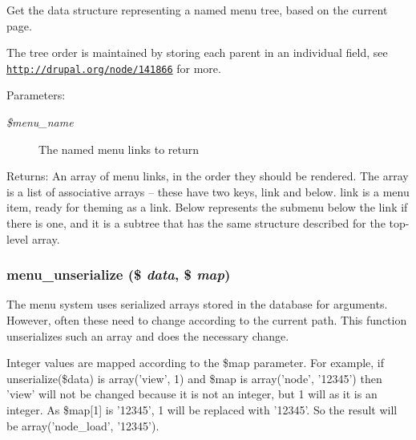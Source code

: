 Get the data structure representing a named menu tree, based on the current page.

The tree order is maintained by storing each parent in an individual field, see \href{http://drupal.org/node/141866}{\tt http://drupal.org/node/141866} for more.

\begin{Desc}
\item[Parameters:]
\begin{description}
\item[{\em \$menu\_\-name}]The named menu links to return \end{description}
\end{Desc}
\begin{Desc}
\item[Returns:]An array of menu links, in the order they should be rendered. The array is a list of associative arrays -- these have two keys, link and below. link is a menu item, ready for theming as a link. Below represents the submenu below the link if there is one, and it is a subtree that has the same structure described for the top-level array. \end{Desc}
\hypertarget{group__menu_g3f9fe4d53dc9d9c3724f956f1465b5be}{
\subsubsection[{menu\_\-unserialize}]{\setlength{\rightskip}{0pt plus 5cm}menu\_\-unserialize (\$ {\em data}, \/  \$ {\em map})}}
\label{group__menu_g3f9fe4d53dc9d9c3724f956f1465b5be}


The menu system uses serialized arrays stored in the database for arguments. However, often these need to change according to the current path. This function unserializes such an array and does the necessary change.

Integer values are mapped according to the \$map parameter. For example, if unserialize(\$data) is array('view', 1) and \$map is array('node', '12345') then 'view' will not be changed because it is not an integer, but 1 will as it is an integer. As \$map\mbox{[}1\mbox{]} is '12345', 1 will be replaced with '12345'. So the result will be array('node\_\-load', '12345').

